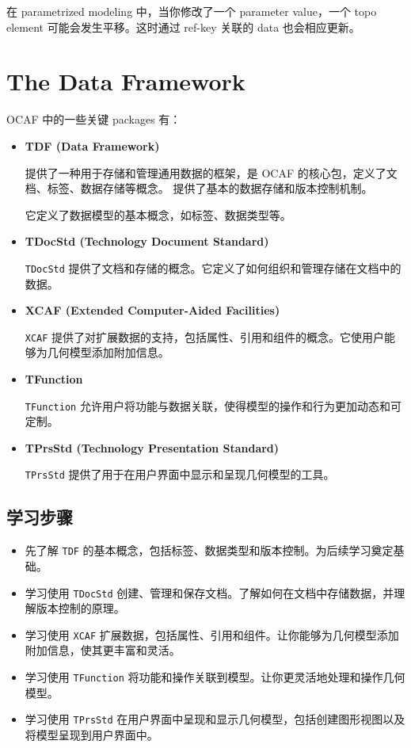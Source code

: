 \documentclass[11pt]{article}
\begin{document}
在 parametrized modeling 中，当你修改了一个 parameter value，一个 topo element 可能会发生平移。这时通过 ref-key 关联的 data 也会相应更新。
\section{The Data Framework}
\label{sec:orgf02c9f8}

OCAF 中的一些关键 packages 有：

\begin{itemize}
\item \textbf{TDF (Data Framework)}

提供了一种用于存储和管理通用数据的框架，是 OCAF 的核心包，定义了文档、标签、数据存储等概念。
提供了基本的数据存储和版本控制机制。

它定义了数据模型的基本概念，如标签、数据类型等。

\item \textbf{TDocStd (Technology Document Standard)}

\texttt{TDocStd} 提供了文档和存储的概念。它定义了如何组织和管理存储在文档中的数据。

\item \textbf{XCAF (Extended Computer-Aided Facilities)}

\texttt{XCAF} 提供了对扩展数据的支持，包括属性、引用和组件的概念。它使用户能够为几何模型添加附加信息。

\item \textbf{TFunction}

\texttt{TFunction} 允许用户将功能与数据关联，使得模型的操作和行为更加动态和可定制。

\item \textbf{TPrsStd (Technology Presentation Standard)}

\texttt{TPrsStd} 提供了用于在用户界面中显示和呈现几何模型的工具。
\end{itemize}
\subsection{学习步骤}
\label{sec:org1e7e4f6}

\begin{itemize}
\item 先了解 \texttt{TDF} 的基本概念，包括标签、数据类型和版本控制。为后续学习奠定基础。
\item 学习使用 \texttt{TDocStd} 创建、管理和保存文档。了解如何在文档中存储数据，并理解版本控制的原理。
\item 学习使用 \texttt{XCAF} 扩展数据，包括属性、引用和组件。让你能够为几何模型添加附加信息，使其更丰富和灵活。
\item 学习使用 \texttt{TFunction} 将功能和操作关联到模型。让你更灵活地处理和操作几何模型。
\item 学习使用 \texttt{TPrsStd} 在用户界面中呈现和显示几何模型，包括创建图形视图以及将模型呈现到用户界面中。
\end{itemize}
\end{document}
